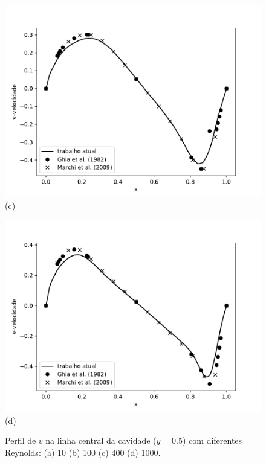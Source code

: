 \begin{figure}[H]
\begin{minipage}{.5\linewidth}
      \centering
      \includegraphics[scale=0.53]{./02_chaps/cap_validation/figure/Re_400_v_profile.pdf}\\
      (c)
     \end{minipage}%
     \begin{minipage}{.5\linewidth}
      \centering
      \includegraphics[scale=0.53]{./02_chaps/cap_validation/figure/Re_1000_v_profile.pdf}\\
      (d)
     \end{minipage}
     \medskip
     \caption{Perfil de $v$ na linha central da cavidade ($y=0.5$) com diferentes Reynolds:
     (a) 10
     (b) 100
     (c) 400
     (d) 1000.}
     \label{velocity vy cavity}
\end{figure}

